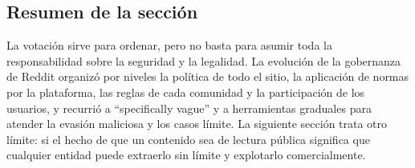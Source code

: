 \subsection{Resumen de la sección}

La votación sirve para ordenar, pero no basta para asumir toda la responsabilidad sobre la seguridad y la legalidad. La evolución de la gobernanza de Reddit organizó por niveles la política de todo el sitio, la aplicación de normas por la plataforma, las reglas de cada comunidad y la participación de los usuarios, y recurrió a ``specifically vague'' y a herramientas graduales para atender la evasión maliciosa y los casos límite. La siguiente sección trata otro límite: si el hecho de que un contenido sea de lectura pública significa que cualquier entidad puede extraerlo sin límite y explotarlo comercialmente.
